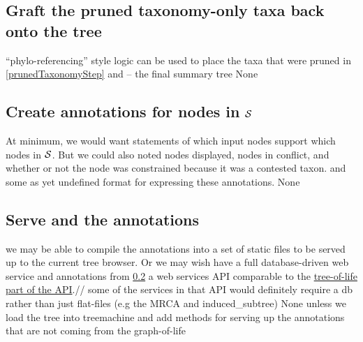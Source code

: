 \documentclass[11pt]{article}
\begin{document}
\subsection{Graft the pruned taxonomy-only taxa back onto the tree}
\stepExplanation ``phylo-referencing'' style logic can be used to place the
    taxa that were pruned in \ref{prunedTaxonomyStep}
\stepInput \prunedSummary and \taxonomy
\stepOutput \summaryTree -- the final summary tree
\currImpl None
\implTODO {}

\subsection{Create annotations for nodes in $\mathcal{S}$}\label{annotationsStep}
\stepExplanation At minimum, we would want statements of which
    input nodes support which nodes in $\mathcal{S}$.
    But we could also noted nodes displayed, nodes in conflict, 
    and whether or not the node was constrained because it was a contested taxon.
\stepInput \summaryTree and \expandedPhylo
\stepOutput some as yet undefined format for expressing these annotations.
\currImpl None
\implTODO {}

\subsection{Serve \summaryTree and the annotations}
\stepExplanation we may be able to compile the annotations into a set of
    static files to be served up to the current tree browser.
    Or we may wish have a full database-driven web service
    \stepInput \summaryTree and annotations from \ref{annotationsStep}
\stepOutput a web services API comparable to the
    \href{https://github.com/OpenTreeOfLife/opentree/wiki/Open-Tree-of-Life-APIs#tree-of-life}{tree-of-life part of the API}.//
    some of the services in that API would definitely require a db rather than just flat-files (e.g the MRCA and induced\_subtree)
\currImpl None unless we load the tree into treemachine and add methods for
    serving up the annotations that are not coming from the graph-of-life
\implTODO {}


\newpage
\end{document}
